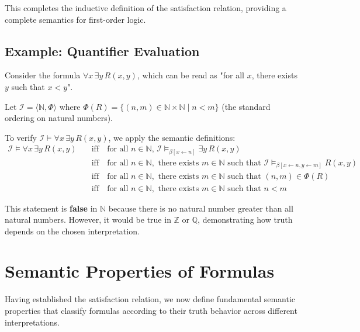 \documentclass[11pt,a4paper]{article}
\theoremstyle{definition}
\theoremstyle{plain}
\theoremstyle{remark}
\newcommand{\N}{\mathbb{N}}
\begin{document}
This completes the inductive definition of the satisfaction relation, providing a complete semantics for first-order logic.

\subsection{Example: Quantifier Evaluation}

Consider the formula $\forall x \, \exists y \, R(x, y)$, which can be read as "for all $x$, there exists $y$ such that $x < y$".

Let $\mathcal{I} = \langle \N, \Phi \rangle$ where $\Phi(R) = \{(n, m) \in \N \times \N \mid n < m\}$ (the standard ordering on natural numbers).

To verify $\mathcal{I} \models \forall x \, \exists y \, R(x, y)$, we apply the semantic definitions:
\begin{align*}
\mathcal{I} \models \forall x \, \exists y \, R(x, y) 
&\quad \text{iff} \quad \text{for all } n \in \N, \, \mathcal{I} \models_{\beta[x \leftarrow n]} \exists y \, R(x, y) \\
&\quad \text{iff} \quad \text{for all } n \in \N, \text{ there exists } m \in \N \text{ such that } \mathcal{I} \models_{\beta[x \leftarrow n, y \leftarrow m]} R(x, y) \\
&\quad \text{iff} \quad \text{for all } n \in \N, \text{ there exists } m \in \N \text{ such that } (n, m) \in \Phi(R) \\
&\quad \text{iff} \quad \text{for all } n \in \N, \text{ there exists } m \in \N \text{ such that } n < m
\end{align*}

This statement is \textbf{false} in $\N$ because there is no natural number greater than all natural numbers. However, it would be true in $\mathbb{Z}$ or $\mathbb{Q}$, demonstrating how truth depends on the chosen interpretation.

\section{Semantic Properties of Formulas}

Having established the satisfaction relation, we now define fundamental semantic properties that classify formulas according to their truth behavior across different interpretations.
\end{document}
